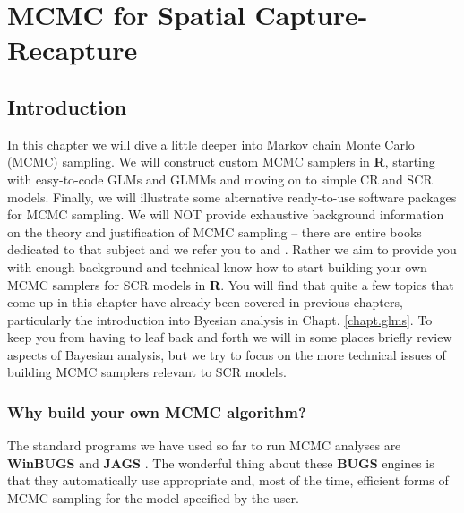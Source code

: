 \chapter{
MCMC for Spatial Capture-Recapture
}
\label{chapt.mcmc}


\vspace{.3in}

\section{Introduction}
In this chapter we will dive a little deeper into Markov chain Monte
Carlo (MCMC) sampling. We will construct custom MCMC samplers in {\bf R},
starting with easy-to-code GLMs and GLMMs and moving on to simple CR and SCR
models. Finally, we will illustrate some alternative
ready-to-use software packages for MCMC sampling. We will NOT provide
exhaustive background information on the theory and justification of
MCMC sampling – there are entire books dedicated to that subject and
we refer you to \citet{robert_casella:2004} and
\citet{robert_casella:2010}. Rather we aim to provide you with enough
background and technical know-how to start building your own MCMC
samplers for SCR models in {\bf R}. You will find that quite a few topics that come up 
in this chapter have already been covered in previous chapters, particularly the introduction
into Byesian analysis in Chapt. \ref{chapt.glms}. To keep you from having to leaf back and forth
we will in some places briefly review aspects of Bayesian analysis, but we try to focus on the more 
technical issues of building MCMC samplers relevant to SCR models. 



\subsection{Why build your own MCMC algorithm?}

The standard programs we have used so far to run MCMC analyses are
{\bf WinBUGS} \citep{gilks_etal:1994} and {\bf JAGS}
\citep{plummer:2003}. The wonderful thing about these {\bf BUGS}
engines
is that they automatically use  appropriate and, most of the time,
efficient forms
of MCMC sampling for the model specified by the user.

